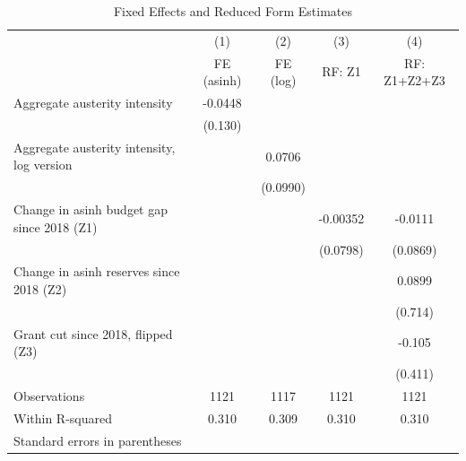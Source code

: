 \begin{table}[htbp]\centering
\def\sym#1{\ifmmode^{#1}\else\(^{#1}\)\fi}
\caption{Fixed Effects and Reduced Form Estimates}
\begin{tabular}{l*{4}{c}}
\toprule
                    &\multicolumn{1}{c}{(1)}&\multicolumn{1}{c}{(2)}&\multicolumn{1}{c}{(3)}&\multicolumn{1}{c}{(4)}\\
                    &\multicolumn{1}{c}{FE (asinh)}&\multicolumn{1}{c}{FE (log)}&\multicolumn{1}{c}{RF: Z1}&\multicolumn{1}{c}{RF: Z1+Z2+Z3}\\
\midrule
Aggregate austerity intensity&     -0.0448         &                     &                     &                     \\
                    &     (0.130)         &                     &                     &                     \\
\addlinespace
Aggregate austerity intensity, log version&                     &      0.0706         &                     &                     \\
                    &                     &    (0.0990)         &                     &                     \\
\addlinespace
Change in asinh budget gap since 2018 (Z1)&                     &                     &    -0.00352         &     -0.0111         \\
                    &                     &                     &    (0.0798)         &    (0.0869)         \\
\addlinespace
Change in asinh reserves since 2018 (Z2)&                     &                     &                     &      0.0899         \\
                    &                     &                     &                     &     (0.714)         \\
\addlinespace
Grant cut since 2018, flipped (Z3)&                     &                     &                     &      -0.105         \\
                    &                     &                     &                     &     (0.411)         \\
\midrule
Observations        &        1121         &        1117         &        1121         &        1121         \\
Within R-squared    &       0.310         &       0.309         &       0.310         &       0.310         \\
\bottomrule
\multicolumn{5}{l}{\footnotesize Standard errors in parentheses}\\

\end{tabular}
\end{table}
